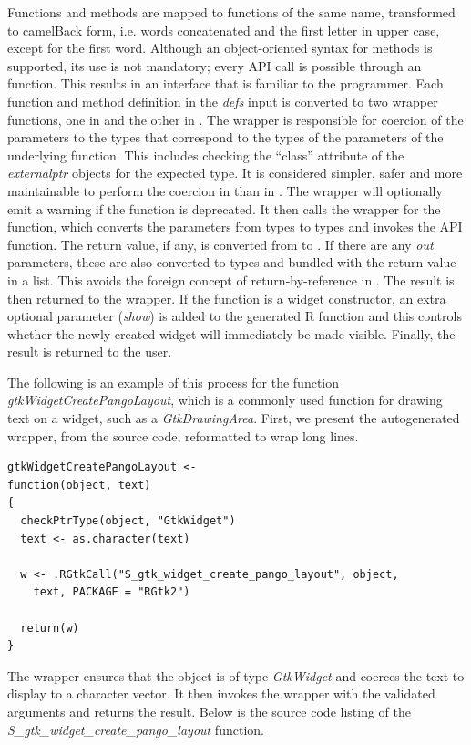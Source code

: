 \documentclass[article]{jss}
\begin{document}
Functions and methods are mapped to  functions of the same
name, transformed to camelBack form, i.e. words concatenated and the
first letter in upper case, except for the first word. Although an
object-oriented syntax for methods is supported, its use is not
mandatory; every API call is possible through an 
function. This results in an interface that is familiar to the
 programmer. Each function and method definition in the
\emph{defs} input is converted to two wrapper functions, one in
 and the other in .  The  wrapper
is responsible for coercion of the parameters to the 
types that correspond to the  types of the parameters of
the underlying  function. This includes checking the
``class'' attribute of the \emph{externalptr} objects for the expected
type.  It is considered simpler, safer and more maintainable to
perform the coercion in  than in . The
 wrapper will optionally emit a warning if the function is
deprecated.  It then calls the  wrapper for the function,
which converts the parameters from  types to 
types and invokes the API function. The return value, if any, is
converted from  to . If there are any
\emph{out} parameters, these are also converted to  types
and bundled with the return value in a list. This avoids the foreign
concept of return-by-reference in . The result is then
returned to the  wrapper. If the function is a widget
constructor, an extra optional parameter (\emph{show}) is added to the
generated R function and this controls whether the newly created
widget will immediately be made visible. Finally, the result is
returned to the user.

The following is an example of this process for the function 
\emph{gtkWidgetCreatePangoLayout}, which is a commonly used function
for
drawing text on a widget, such as a \emph{GtkDrawingArea}. First, we
present
the autogenerated  wrapper, from the  source
code, 
reformatted to wrap long lines.
\begin{verbatim}
gtkWidgetCreatePangoLayout <-
function(object, text)
{
  checkPtrType(object, "GtkWidget")
  text <- as.character(text)

  w <- .RGtkCall("S_gtk_widget_create_pango_layout", object, 
    text, PACKAGE = "RGtk2")

  return(w)
}
\end{verbatim}
The wrapper ensures that the object is of type \emph{GtkWidget} and
coerces
the text to display to a character vector. It then invokes the
wrapper with the validated arguments and returns the result. Below is
the
source code listing of the
\emph{S\_gtk\_widget\_create\_pango\_layout} function.
\end{document}

